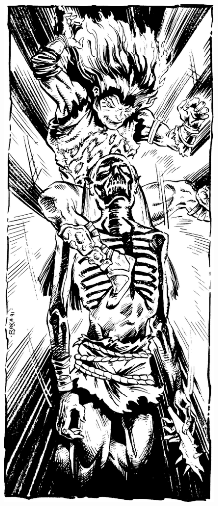 \begin{figure}[t!]
\centering
\includegraphics[width=\columnwidth]{images/psionic-1.png}
\WOTC
\end{figure}

